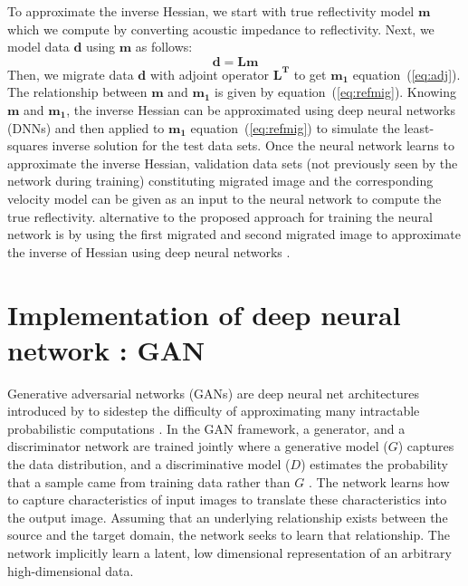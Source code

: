 To approximate the inverse Hessian, we start with true reflectivity model $\mathbf m$ which we compute by converting acoustic impedance to reflectivity. Next, we model data $\mathbf d$ using $\mathbf m$ as follows:
\begin{equation}
\mathbf d=\mathbf{Lm}
\label{eq:remod}
\end{equation}
Then, we migrate data $\mathbf d$ with adjoint operator $\mathbf {L^T}$ to get $\mathbf {m_1}$ equation~(\ref{eq:adj}). The relationship between $\mathbf m$ and $\mathbf{m_1}$ is given by equation~(\ref{eq:refmig}). Knowing $\mathbf{m}$ and $\mathbf{m_1}$, the inverse Hessian can be approximated using deep neural networks (DNNs) and then applied to $\mathbf{m_1}$ equation~(\ref{eq:refmig}) to simulate the least-squares inverse solution for the test data sets. Once the neural network learns to approximate the inverse Hessian, validation data sets (not previously seen by the network during training) constituting migrated image and the corresponding velocity model can be given as an input to the neural network to compute the true reflectivity.  alternative to the proposed approach for training the neural network is by using the first migrated and second migrated image to approximate the inverse of Hessian using deep neural networks \cite[]{guitton2004amplitude,greer2018improving}. 

\section{Implementation of deep neural network : GAN}
\hspace{\parindent} Generative adversarial networks (GANs) are deep neural net architectures introduced by \cite{goodfellow2014generative} to sidestep the difficulty of approximating many intractable probabilistic computations \cite[]{mirza2014conditional}. In the GAN framework, a generator, and a discriminator network are trained jointly where a generative model ($G$) captures the data distribution, and a discriminative model ($D$) estimates the probability that a sample came from training data rather than $G$ \cite[]{goodfellow2014generative}. The network learns how to capture characteristics of input images to translate these characteristics into the output image. Assuming that an underlying relationship exists between the source and the target domain, the network seeks to learn that relationship. The network implicitly learn a latent, low dimensional representation of an arbitrary high-dimensional data.\\ 


